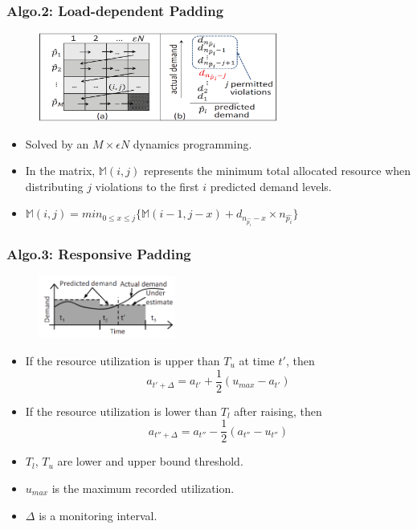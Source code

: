 \documentclass{beamer}
\begin{document}
	\begin{frame}
	\frametitle{Algo.2: Load-dependent Padding}
		\begin{figure}[h!]
		\centering
		\includegraphics[width=0.7\textwidth]{./figure/alg2_1.PNG}
		\end{figure}
		\begin{itemize}
		\item Solved by an $M\times \epsilon N$ dynamics programming.
		\item In the matrix, $\mathbb{M}(i,j)$ represents the minimum total allocated resource when distributing $j$ violations to the first $i$ predicted demand levels.
		\item $\mathbb{M}(i,j)=min_{0\leq x\leq j}\{ \mathbb{M}(i-1,j-x)+d_{n_{\hat{p_{i}}}-x}\times n_{\hat{p_{i}}} \}$
		\end{itemize}
	\end{frame}

	\begin{frame}
	\frametitle{Algo.3: Responsive Padding}
		\begin{figure}[h!]
		\centering
		\includegraphics[width=0.4\textwidth]{./figure/alg3_1.PNG}
		\end{figure}
		\begin{itemize}
		\item If the resource utilization is upper than $T_{u}$ at time $t'$, then
		\begin{equation} a_{t'+\Delta}=a_{t'}+\frac{1}{2}(u_{max}-a_{t'}) \end{equation}
		\item If the resource utilization is lower than $T_{l}$ after raising, then
		\begin{equation} a_{t''+\Delta}=a_{t''}-\frac{1}{2}(a_{t''}-u_{t''}) \end{equation}
		\item $T_{l}$, $T_{u}$ are lower and upper bound threshold.
		\item $u_{max}$ is the maximum recorded utilization.
		\item $\Delta$ is a monitoring interval.
		\end{itemize}
	\end{frame}
\end{document}
